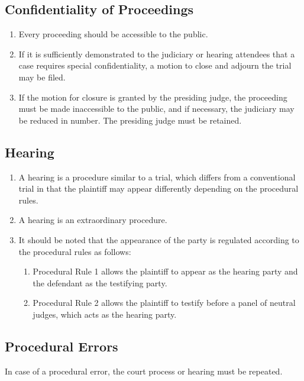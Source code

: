 \documentclass{article}
\begin{document}
\subsection{Confidentiality of Proceedings}
\begin{enumerate}[(1)]
    \item Every proceeding should be accessible to the public.
    \item If it is sufficiently demonstrated to the judiciary or hearing attendees that a case requires special confidentiality, a motion to close and adjourn the trial may be filed.
    \item If the motion for closure is granted by the presiding judge, the proceeding must be made inaccessible to the public, and if necessary, the judiciary may be reduced in number. The presiding judge must be retained.
\end{enumerate}

\subsection{Hearing}
\begin{enumerate}[(1)]
    \item A hearing is a procedure similar to a trial, which differs from a conventional trial in that the plaintiff may appear differently depending on the procedural rules.
    \item A hearing is an extraordinary procedure.
    \item It should be noted that the appearance of the party is regulated according to the procedural rules as follows:
    \begin{enumerate}[1.]
        \item Procedural Rule 1 allows the plaintiff to appear as the hearing party and the defendant as the testifying party.
        \item Procedural Rule 2 allows the plaintiff to testify before a panel of neutral judges, which acts as the hearing party.
    \end{enumerate}
\end{enumerate}

\subsection{Procedural Errors}
In case of a procedural error, the court process or hearing must be repeated.
\end{document}
